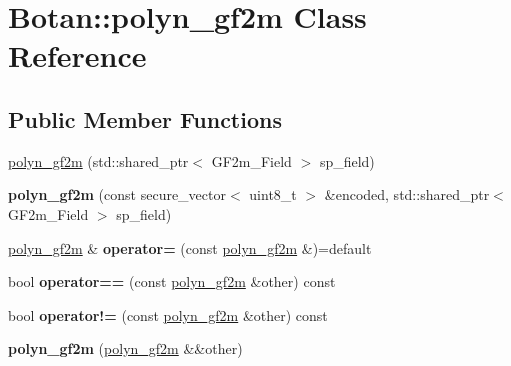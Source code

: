\hypertarget{class_botan_1_1polyn__gf2m}{}\section{Botan\+:\+:polyn\+\_\+gf2m Class Reference}
\label{class_botan_1_1polyn__gf2m}
\subsection*{Public Member Functions}
\begin{DoxyCompactItemize}
\item 
\hyperlink{class_botan_1_1polyn__gf2m_ae99780249cace1fef68912738bd83497}{polyn\+\_\+gf2m} (std\+::shared\+\_\+ptr$<$ G\+F2m\+\_\+\+Field $>$ sp\+\_\+field)
\item 
\mbox{\label{class_botan_1_1polyn__gf2m_a4c0a82c1f0ced864b058a8218b56c0df}} 
{\bfseries polyn\+\_\+gf2m} (const secure\+\_\+vector$<$ uint8\+\_\+t $>$ \&encoded, std\+::shared\+\_\+ptr$<$ G\+F2m\+\_\+\+Field $>$ sp\+\_\+field)
\item 
\mbox{\label{class_botan_1_1polyn__gf2m_ab1398bbd4aeb80eebb6b6cca085380f6}} 
\hyperlink{class_botan_1_1polyn__gf2m}{polyn\+\_\+gf2m} \& {\bfseries operator=} (const \hyperlink{class_botan_1_1polyn__gf2m}{polyn\+\_\+gf2m} \&)=default
\item 
\mbox{\label{class_botan_1_1polyn__gf2m_acf6e5a8cf7cde1a88488d9ae7ca04d5b}} 
bool {\bfseries operator==} (const \hyperlink{class_botan_1_1polyn__gf2m}{polyn\+\_\+gf2m} \&other) const
\item 
\mbox{\label{class_botan_1_1polyn__gf2m_a30f5066e3df095ec651215cc878d2a5c}} 
bool {\bfseries operator!=} (const \hyperlink{class_botan_1_1polyn__gf2m}{polyn\+\_\+gf2m} \&other) const
\item 
\mbox{\label{class_botan_1_1polyn__gf2m_a474b2704b9a6c9be538bc80f97f000b7}} 
{\bfseries polyn\+\_\+gf2m} (\hyperlink{class_botan_1_1polyn__gf2m}{polyn\+\_\+gf2m} \&\&other)
\item 
\mbox{\label{class_botan_1_1polyn__gf2m_afcf87fa0406be9705b98ae3fbedafa88}} 

\end{DoxyCompactItemize}
